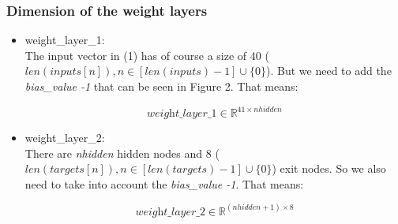 \documentclass[10pt,a4paper]{article}
\begin{document}
	\subsubsection{Dimension of the weight layers}
		\begin{itemize}
		\item weight\_layer\_1: \\
		The input vector in (1) has of course a size of 40 ($len(inputs[n]), n \in [len(inputs) -1] \cup \{0\}$). But we need to add the \textit{bias\_value -1} that can be seen in Figure 2. That means: \\ 
		\begin{center}
			\begin{equation}
			 \textit{weight\_layer\_1} \in \mathbb{R}^{41 \times nhidden} 
			\end{equation}  
		\end{center}
		\item weight\_layer\_2: \\
		There are \textit{nhidden} hidden nodes and 8 ($len(targets[n]), n \in [len(targets) -1] \cup \{0\}$) exit nodes. So we also need to take into account the \textit{bias\_value -1}. That means: \\
		\begin{center}
			\begin{equation}
			\textit{weight\_layer\_2} \in \mathbb{R}^{(nhidden+1) \times 8} 
			\end{equation}  
		\end{center}
		
	\end{itemize} 

		
	 
	
	
\end{document}
